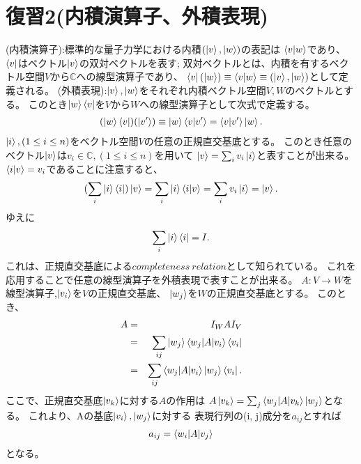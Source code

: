 \hypertarget{hukushuu2}{}
\section{\Large 復習2(内積演算子、外積表現)}
(内積演算子):標準的な量子力学における内積$(\ket{v}, \ket{w})$の表記は
$\braket{v|w}$であり、$\bra{v}$はベクトル$\ket{v}$の双対ベクトルを表す;
双対ベクトルとは、内積を有するベクトル空間$V$から$\mathbb{C}$への線型演算子であり、
$\bra{v}(\ket{w}) \equiv \braket{v|w} \equiv (\ket{v}, \ket{w})$として定義される。
\newline
(外積表現):$\ket{v}, \ket{w}$をそれぞれ内積ベクトル空間$V, W$のベクトルとする。
このとき$\ket{w}\bra{v}$を$V$から$W$への線型演算子として次式で定義する。
\begin{eqnarray*}
(\ket{w}\bra{v})(\ket{v'}) \equiv \ket{w} \braket{v|v'} = \braket{v|v'}\ket{w}.
\end{eqnarray*}
$\ket{i}, (1\leq i\leq n)$をベクトル空間$V$の任意の正規直交基底とする。
このとき任意のベクトル$\ket{v}$は$v_i \in \mathbb{C}, (1\leq i\leq n)$を用いて
$\ket{v} = \sum_i v_i \ket{i}$と表すことが出来る。
$\braket{i|v} = v_i$であることに注意すると、
\begin{eqnarray*}
(\sum_i \ket{i} \bra{i}) \ket{v} = \sum_i \ket{i} \braket{i|v} = \sum_i v_i \ket{i}
= \ket{v}.
\end{eqnarray*}
ゆえに
\begin{eqnarray*}
\sum_i \ket{i} \bra{i} = I.
\end{eqnarray*}
これは、正規直交基底による$completeness~relation$として知られている。
これを応用することで任意の線型演算子を外積表現で表すことが出来る。
\newline
$A:V \to W$を線型演算子,$\ket{v_i}$を$V$の正規直交基底、
$\ket{w_j}$を$W$の正規直交基底とする。
このとき、
\begin{eqnarray*}
A &=& I_W A I_V \\
&=& \sum_{ij} \ket{w_j} \braket{w_j|A|v_i} \bra{v_i} \\
&=& \sum_{ij} \braket{w_j|A|v_i} \ket{w_j} \bra{v_i}.
\end{eqnarray*}
ここで、正規直交基底$\ket{v_k}$に対する$A$の作用は
$A\ket{v_k} = \sum_j \braket{w_j|A|v_k}\ket{w_j}$となる。
これより、Aの基底$\ket{v_i}, \ket{w_j}$に対する
表現行列の(i, j)成分を$a_{ij}$とすれば
\begin{eqnarray*}
a_{ij} = \braket{w_i|A|v_j}
\end{eqnarray*}
となる。

